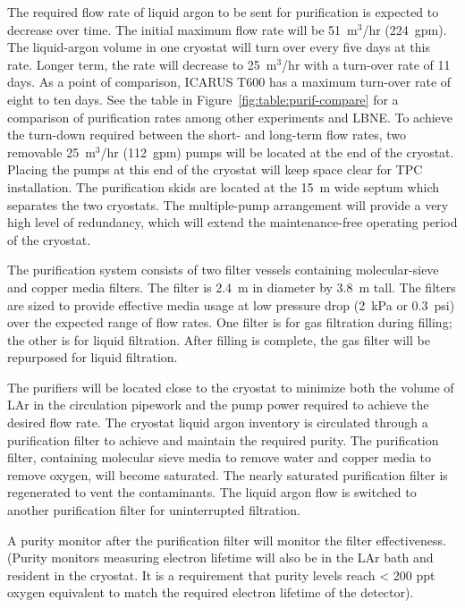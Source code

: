 The required flow rate of liquid argon to be sent for purification is expected to decrease over time.  The 
initial maximum flow rate will be 51~m$^3$/hr (224~gpm).  The liquid-argon volume in one cryostat will turn over every five days at this rate. 
 Longer term, the rate will decrease to 25~m$^3$/hr with a turn-over rate of 11 days.  As a point of comparison, ICARUS T600 has a maximum turn-over rate of eight to ten days. See the table in Figure~\ref{fig:table:purif-compare} for a comparison of purification rates among other  experiments and LBNE. To achieve the turn-down required between the short- and long-term flow rates, two removable 25~m$^3$/hr (112~gpm) pumps will be located at the end of the cryostat.  Placing the pumps at this end of the cryostat will keep space clear for TPC installation. The purification skids are located at the 15~m wide septum which separates the two cryostats.  The multiple-pump arrangement will provide a very high level of redundancy, which will extend the maintenance-free operating period of the cryostat.  


The purification system consists of two filter vessels containing molecular-sieve and copper media filters. The filter is 2.4~m in diameter by 3.8~m tall. The filters are sized to provide effective media usage at low pressure drop (2~kPa or 0.3~psi) over the expected range of flow rates. 
One filter is for gas filtration during filling; the other is for liquid filtration. After filling is complete, the gas filter will be repurposed for liquid filtration.

The 
purifiers will be located close to the cryostat to minimize both the volume of LAr in the circulation pipework 
and the pump power required to achieve the desired flow rate.  
The cryostat liquid argon inventory is circulated through a purification filter to achieve and maintain the required purity. The purification filter, containing molecular sieve media to remove water and copper media to remove oxygen, will become saturated.
The nearly saturated purification filter is regenerated to vent the contaminants. The liquid argon flow is switched to another purification filter for uninterrupted filtration. 

A purity monitor after the purification filter will monitor the filter effectiveness. (Purity monitors measuring electron lifetime will also be in the LAr bath and resident in the cryostat.  It is a requirement that purity levels reach < 200 ppt oxygen equivalent to match the required electron lifetime of the detector). 

